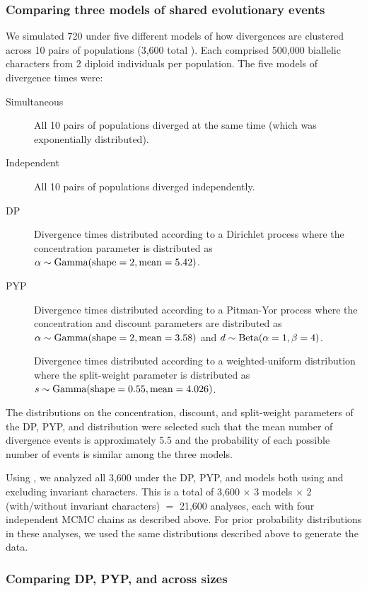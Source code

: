 \documentclass[letterpaper,12pt]{article}
\begin{document}
\subsubsection{Comparing three models of shared evolutionary events}

We simulated 720 \datasets under five different models of how divergences are
clustered across 10 pairs of populations (3,600 total \datasets).
Each \dataset comprised 500,000 biallelic characters from 2 diploid individuals
per population.
The five models of divergence times were:
\begin{description}
    \item[Simultaneous] All 10 pairs of populations diverged at the same time
        (which was exponentially distributed).
    \item[Independent] All 10 pairs of populations diverged independently.
    \item[DP] Divergence times distributed according to a Dirichlet process
        where the concentration parameter is distributed as
        $\alpha \sim \textrm{Gamma}(\textrm{shape} = 2, \textrm{mean} = 5.42)$.
    \item[PYP] Divergence times distributed according to a Pitman-Yor process
        where the concentration and discount parameters are distributed as
        $\alpha \sim \textrm{Gamma}(\textrm{shape} = 2, \textrm{mean} = 3.58)$
        and
        $d \sim \textrm{Beta}(\alpha = 1, \beta = 4)$.
    \item[\wunif] Divergence times distributed according to a
        weighted-uniform distribution
        where the split-weight parameter is distributed as
        $s \sim \textrm{Gamma}(\textrm{shape} = 0.55, \textrm{mean} = 4.026)$.
\end{description}
The distributions on the concentration, discount, and split-weight parameters of
the DP, PYP, and \wunif distribution were selected such that the mean number of
divergence events is approximately 5.5
and the probability of each possible number of events
is similar among the three models.

Using \ecoevolity, we analyzed all 3,600 \datasets under the
DP, PYP, and \wunif models both using and excluding invariant characters.
This is a total of
3,600 \datasets $\times$ 3 models $\times$ 2 (with/without invariant characters) $=$ 21,600
analyses, each with four independent MCMC chains as described above.
For prior probability distributions in these analyses,
we used the same distributions described above to generate the data.


\subsubsection{Comparing DP, PYP, and \wunif across \dataset sizes}
\end{document}
